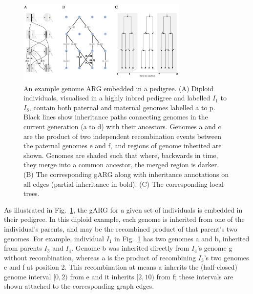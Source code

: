 \documentclass{article}
\newcommand{\noderef}[1]{\textsf{#1}}
\begin{document}
\begin{figure}
\begin{center}
    \includegraphics[width=0.75\textwidth]{illustrations/arg-in-pedigree}
\end{center}
\caption{\label{fig-arg-in-pedigree}
An example genome ARG embedded in a pedigree.
(A) Diploid individuals, visualised in a highly inbred pedigree and
labelled $I_1$ to $I_8$, contain both paternal and maternal  genomes
labelled \textsf{a} to \textsf{p}. Black lines show inheritance paths connecting
genomes in the current generation (\textsf{a} to \textsf{d}) with their ancestors.
Genomes \textsf{a} and \textsf{c} are the product of two independent
recombination events between
the paternal genomes \textsf{e}
and \textsf{f}, and regions of genome inherited are shown.
Genomes are shaded such that where, backwards in time,
they merge into a common ancestor, the merged region is darker.
(B) The corresponding gARG along with inheritance annotations on all edges
(partial inheritance in bold).
(C) The corresponding local trees.
}
\end{figure}

As illustrated in Fig.~\ref{fig-arg-in-pedigree},
the gARG for a given set of individuals is embedded in their pedigree.
In this diploid example, each genome is inherited from one
of the individual's parents,
and may be the recombined product of that parent's two genomes.
For example, individual $I_1$ in Fig.~\ref{fig-arg-in-pedigree}
has two genomes \noderef{a} and \noderef{b},
inherited from parents $I_3$ and $I_4$.
Genome \noderef{b} was inherited directly from $I_4$'s genome \noderef{g} without
recombination, whereas
\noderef{a} is the product of
recombining $I_3$'s two genomes \noderef{e} and \noderef{f} at position 2.
This recombination at means \noderef{a} inherits the (half-closed) genome
interval $[0, 2)$ from \noderef{e} and it inherits $[2, 10)$ from \noderef{f};
these intervals are shown attached to the corresponding graph edges.
\end{document}
